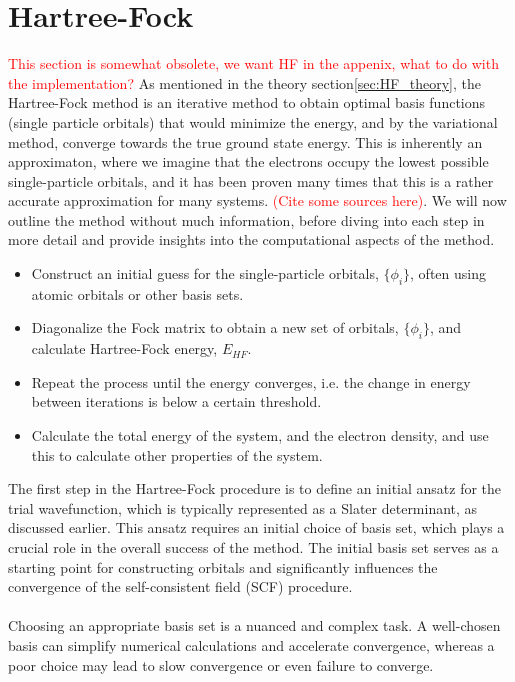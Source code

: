 \documentclass{subfiles}
\begin{document}
\section{Hartree-Fock}\textcolor{red}{This section is somewhat obsolete, we want HF in the appenix, what to do with the implementation?}
As mentioned in the theory section\ref{sec:HF_theory}, the Hartree-Fock method is an iterative method to obtain optimal basis functions (single particle orbitals) that would minimize the energy, and by the variational method, converge towards the true ground state energy. This is inherently an approximaton, where we imagine that the electrons occupy the lowest possible single-particle orbitals, and it has been proven many times that this is a rather accurate approximation for many systems. \textcolor{red}{(Cite some sources here)}.
We will now outline the method without much information, before diving into each step in more detail and provide insights into the computational aspects of the method.
\begin{itemize}
    \item Construct an initial guess for the single-particle orbitals, $\{\phi_i\}$, often using atomic orbitals or other basis sets.
    \item Diagonalize the Fock matrix to obtain a new set of orbitals, $\{\phi_i\}$, and calculate Hartree-Fock energy, $E_{HF}$.
    \item Repeat the process until the energy converges, i.e. the change in energy between iterations is below a certain threshold.
    \item Calculate the total energy of the system, and the electron density, and use this to calculate other properties of the system.
\end{itemize}
The first step in the Hartree-Fock procedure is to define an initial ansatz for the trial wavefunction, which is typically represented as a Slater determinant, as discussed earlier. This ansatz requires an initial choice of basis set, which plays a crucial role in the overall success of the method. The initial basis set serves as a starting point for constructing orbitals and significantly influences the convergence of the self-consistent field (SCF) procedure.\\  
\\ Choosing an appropriate basis set is a nuanced and complex task. A well-chosen basis can simplify numerical calculations and accelerate convergence, whereas a poor choice may lead to slow convergence or even failure to converge. 
\\ \\
\end{document}
